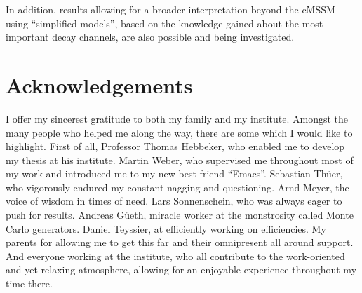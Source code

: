 In addition, results allowing for a broader interpretation beyond the cMSSM using ``simplified models'', based on the knowledge gained about the most important decay channels, are also possible and being investigated.

\clearpage
\section*{Acknowledgements} 
\label{sec:acknowledgements}

I offer my sincerest gratitude to both my family and my institute. Amongst the many people who helped me along the way, there are some which I would like to highlight. First of all, Professor Thomas Hebbeker, who enabled me to develop my thesis at his institute. Martin Weber, who supervised me throughout most of my work and introduced me to my new best friend ``Emacs''. Sebastian Th\"uer, who vigorously endured my constant nagging and questioning. Arnd Meyer, the voice of wisdom in times of need. Lars Sonnenschein, who was always eager to push for results. Andreas G\"ueth, miracle worker at the monstrosity called Monte Carlo generators. Daniel Teyssier, at efficiently working on efficiencies. My parents for allowing me to get this far and their omnipresent all around support. And everyone working at the institute, who all contribute to the work-oriented and yet relaxing atmosphere, allowing for an enjoyable experience throughout my time there.

